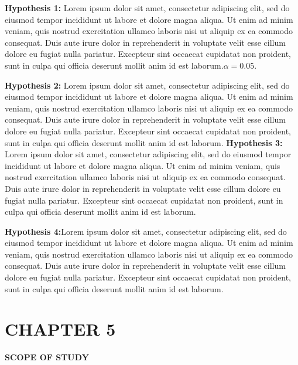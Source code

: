 \documentclass[12pt]{article}
\newcommand{\centersection}[1]{%
  \begin{center}
    \fontfamily{ptm}\fontsize{14}{16}\selectfont\bfseries\uppercase{#1}
  \end{center}
}
\begin{document}
\textbf{Hypothesis 1:} 
Lorem ipsum dolor sit amet, consectetur adipiscing elit, sed do eiusmod tempor incididunt ut labore et dolore magna aliqua. Ut enim ad minim veniam, quis nostrud exercitation ullamco laboris nisi ut aliquip ex ea commodo consequat. Duis aute irure dolor in reprehenderit in voluptate velit esse cillum dolore eu fugiat nulla pariatur. Excepteur sint occaecat cupidatat non proident, sunt in culpa qui officia deserunt mollit anim id est laborum.$\alpha = 0.05$.

\textbf{Hypothesis 2:} Lorem ipsum dolor sit amet, consectetur adipiscing elit, sed do eiusmod tempor incididunt ut labore et dolore magna aliqua. Ut enim ad minim veniam, quis nostrud exercitation ullamco laboris nisi ut aliquip ex ea commodo consequat. Duis aute irure dolor in reprehenderit in voluptate velit esse cillum dolore eu fugiat nulla pariatur. Excepteur sint occaecat cupidatat non proident, sunt in culpa qui officia deserunt mollit anim id est laborum.
\textbf{Hypothesis 3:} Lorem ipsum dolor sit amet, consectetur adipiscing elit, sed do eiusmod tempor incididunt ut labore et dolore magna aliqua. Ut enim ad minim veniam, quis nostrud exercitation ullamco laboris nisi ut aliquip ex ea commodo consequat. Duis aute irure dolor in reprehenderit in voluptate velit esse cillum dolore eu fugiat nulla pariatur. Excepteur sint occaecat cupidatat non proident, sunt in culpa qui officia deserunt mollit anim id est laborum.

\textbf{Hypothesis 4:}Lorem ipsum dolor sit amet, consectetur adipiscing elit, sed do eiusmod tempor incididunt ut labore et dolore magna aliqua. Ut enim ad minim veniam, quis nostrud exercitation ullamco laboris nisi ut aliquip ex ea commodo consequat. Duis aute irure dolor in reprehenderit in voluptate velit esse cillum dolore eu fugiat nulla pariatur. Excepteur sint occaecat cupidatat non proident, sunt in culpa qui officia deserunt mollit anim id est laborum.
\newpage %

\section*{CHAPTER 5}
\centersection{SCOPE OF STUDY}
\end{document}
